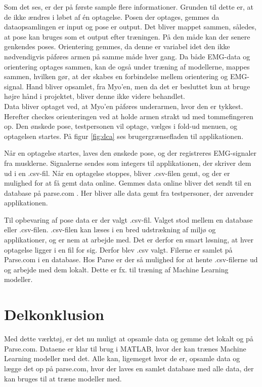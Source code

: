 Som det ses, er der på første sample flere informationer. Grunden til dette er, at de ikke ændres i løbet af én optagelse. Posen der optages, gemmes da dataopsamlingen er input og pose er output. Det bliver mappet sammen, således, at pose kan bruges som et output efter træningen. På den måde kan der senere genkendes poses. Orientering gemmes, da denne er variabel idet den ikke nødvendigvis påføres armen på samme måde hver gang. Da både EMG-data og orientering optages sammen, kan de også under træning af modellerne, mappes sammen, hvilken gør, at der skabes en forbindelse mellem orientering og EMG-signal. Hand bliver opsamlet, fra Myo'en, men da det er besluttet kun at bruge højre hånd i projektet, bliver denne ikke videre behandlet.\\
Data bliver optaget ved, at Myo'en påføres underarmen, hvor den er tykkest. Herefter checkes orienteringen ved at holde armen strakt ud med tommefingeren op. Den ønskede pose, testpersonen vil optage, vælges i fold-ud menuen, og optagelsen startes. På figur \ref{fig:dca} ses brugergrænsefladen til applikationen.


Når en optagelse startes, laves den ønskede pose, og der registreres EMG-signaler fra musklerne. Signalerne sendes som integers til applikationen, der skriver dem ud i en .csv-fil. Når en optagelse stoppes, bliver .csv-filen gemt, og der er mulighed for at få gemt data online. Gemmes data online bliver det sendt til en database på parse.com \citep{RefWorks:11}. Her bliver alle data gemt fra testpersoner, der anvender applikationen.

Til opbevaring af pose data er der valgt .csv-fil. Valget stod mellem en database eller .csv-filen. .csv-filen kan læses i en bred udstrækning af miljø og applikationer, og er nem at arbejde med. Det er derfor en smart løsning, at hver optagelse ligger i en fil for sig. Derfor blev .csv valgt. Filerne er samlet på Parse.com i en database. Hos Parse er der så mulighed for at hente .csv-filerne ud og arbejde med dem lokalt. Dette er fx. til træning af Machine Learning modeller.

\section{Delkonklusion}
Med dette værktøj, er det nu muligt at opsamle data og gemme det lokalt og på Parse.com. Dataene er klar til brug i MATLAB, hvor der kan trænes Machine Learning modeller med det. Alle kan, ligemeget hvor de er, opsamle data og lægge det op på parse.com, hvor der laves en samlet database med alle data, der kan bruges til at træne modeller med. 